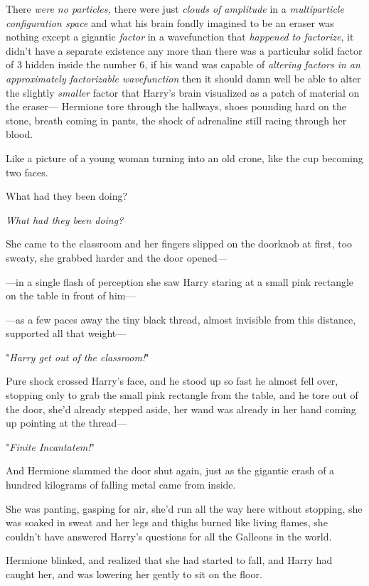 There \emph{were no particles,} there were just \emph{clouds of amplitude} in a 
\emph{multiparticle configuration space} and what his brain fondly imagined to 
be an eraser was nothing except a gigantic \emph{factor} in a wavefunction that 
\emph{happened to factorize}, it didn't have a separate existence any more than 
there was a particular solid factor of 3 hidden inside the number 6, if his 
wand was capable of \emph{altering factors in an approximately factorizable 
wavefunction} then it should damn well be able to alter the slightly 
\emph{smaller} factor that Harry's brain visualized as a patch of material on 
the eraser---
\sbreak
Hermione tore through the hallways, shoes pounding hard on the stone, breath 
coming in pants, the shock of adrenaline still racing through her blood.

Like a picture of a young woman turning into an old crone, like the cup 
becoming two faces.

What had they been doing?

\emph{What had they been doing?}

She came to the classroom and her fingers slipped on the doorknob at first, too 
sweaty, she grabbed harder and the door opened---

---in a single flash of perception she saw Harry staring at a small pink 
rectangle on the table in front of him---

---as a few paces away the tiny black thread, almost invisible from this 
distance, supported all that weight---

"\emph{Harry get out of the classroom!}"

Pure shock crossed Harry's face, and he stood up so fast he almost fell over, 
stopping only to grab the small pink rectangle from the table, and he tore out 
of the door, she'd already stepped aside, her wand was already in her hand 
coming up pointing at the thread---

"\emph{Finite Incantatem!}"

And Hermione slammed the door shut again, just as the gigantic crash of a 
hundred kilograms of falling metal came from inside.

She was panting, gasping for air, she'd run all the way here without stopping, 
she was soaked in sweat and her legs and thighs burned like living flames, she 
couldn't have answered Harry's questions for all the Galleons in the world.

Hermione blinked, and realized that she had started to fall, and Harry had 
caught her, and was lowering her gently to sit on the floor.

